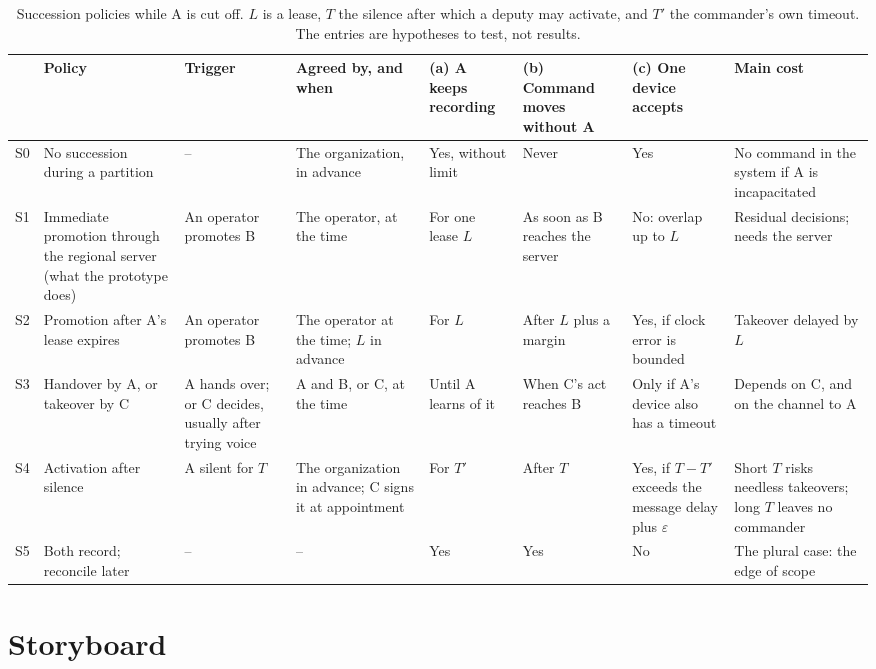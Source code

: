 \documentclass[11pt,a4paper]{article}
\begin{document}
\begin{table}[htbp]
\centering
\caption{Succession policies while A is cut off. $L$ is a lease, $T$ the silence after which
a deputy may activate, and $T'$ the commander's own timeout. The entries are hypotheses to
test, not results.}
\label{tab:policies}
\footnotesize
\setlength{\tabcolsep}{3pt}
\begin{tabularx}{\linewidth}{@{}P{.5cm}P{2.6cm}P{2.1cm}P{2.1cm}P{1.45cm}P{1.75cm}P{1.75cm}L@{}}
\toprule
& \textbf{Policy} & \textbf{Trigger} & \textbf{Agreed by, and when} & \textbf{(a) A keeps
  recording} & \textbf{(b) Command moves without A} & \textbf{(c) One device accepts} &
  \textbf{Main cost} \\
\midrule
S0 & No succession during a partition & -- & The organization, in advance & Yes, without
  limit & Never & Yes & No command in the system if A is incapacitated \\
S1 & Immediate promotion through the regional server (what the prototype does) & An operator
  promotes B & The operator, at the time & For one lease $L$ & As soon as B reaches the
  server & No: overlap up to $L$ & Residual decisions; needs the server \\
S2 & Promotion after A's lease expires & An operator promotes B & The operator at the time;
  $L$ in advance & For $L$ & After $L$ plus a margin & Yes, if clock error is bounded &
  Takeover delayed by $L$ \\
S3 & Handover by A, or takeover by C & A hands over; or C decides, usually after trying
  voice & A and B, or C, at the time & Until A learns of it & When C's act reaches B & Only if
  A's device also has a timeout & Depends on C, and on the channel to A \\
S4 & Activation after silence & A silent for $T$ & The organization in advance; C signs it at
  appointment & For $T'$ & After $T$ & Yes, if $T - T'$ exceeds the message delay plus
  $\varepsilon$ & Short $T$ risks needless takeovers; long $T$ leaves no commander \\
S5 & Both record; reconcile later & -- & -- & Yes & Yes & No & The plural case: the edge of
  scope \\
\bottomrule
\end{tabularx}
\end{table}

\section{Storyboard}
\label{sec:storyboard}
\end{document}
